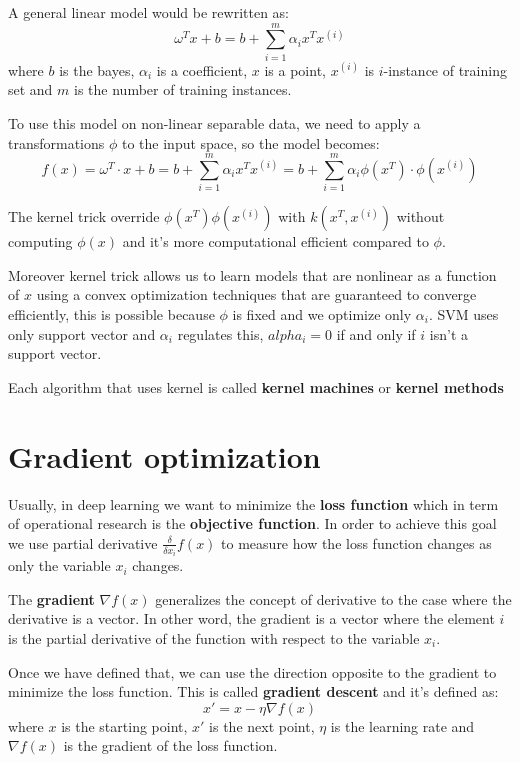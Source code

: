 A general linear model would be rewritten as:
\begin{equation}
    \omega^T x + b = b+ \sum_{i=1}^m \alpha_ix^Tx^{(i)}
\end{equation}
where $b$ is the bayes, $\alpha_i$ is a coefficient, $x$ is a point, $x^(i)$ is
$i$-instance of training set and $m$ is the number of training instances.

To use this model on non-linear separable data, we need to apply a transformations $\phi$
to the input space, so the model becomes:
\begin{equation}
    f(x) = \omega^T \cdot x + b = b + \sum_{i = 1}^m \alpha_ix^Tx^{(i)} = b +
    \sum_{i=1}^m \alpha_i\phi (x^T) \cdot \phi(x^{(i)})
\end{equation}

The kernel trick override $\phi(x^T)\phi(x^{(i)})$ with $k(x^T, x^(i))$ without
computing $\phi(x)$ and it's more computational efficient compared to $\phi$.

Moreover kernel trick allows us to learn models that are nonlinear as a function
of $x$ using a convex optimization techniques that are guaranteed to converge
efficiently, this is possible because $\phi $ is fixed and we optimize only $\alpha_i$.
SVM uses only support vector and $\alpha_i$ regulates this, $alpha_i= 0$ if and
only if $i$ isn't a support vector.

Each algorithm that uses kernel is called \textbf{kernel machines} or \textbf{kernel
    methods}
\section{Gradient optimization}
Usually, in deep learning we want to minimize the \textbf{loss function} which in
term of operational research is the \textbf{objective function}. In order to
achieve this goal we use partial derivative $\frac{\delta}{\delta x_i} f(x)$ to
measure how the loss function changes as only the variable $x_i$ changes.

The \textbf{gradient} $\nabla f(x)$ generalizes the concept of derivative to the
case where the derivative is a vector. In other word, the gradient is a vector
where the element $i$ is the partial derivative of the function with respect to
the variable $x_i$.

Once we have defined that, we can use the direction opposite to the gradient to
minimize the loss function. This is called \textbf{gradient descent} and it's
defined as:
\begin{equation}
    x' = x - \eta \nabla f(x)
\end{equation}
where $x$ is the starting point, $x'$ is the next point, $\eta$ is the learning
rate and $\nabla f(x)$ is the gradient of the loss function.


